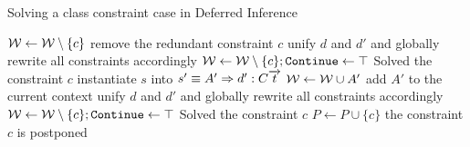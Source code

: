 \begin{algorithm}
    \caption{Solving a class constraint case in Deferred Inference}
    \label{case_class}
    \begin{algorithmic}
            \State $\mathcal W \gets \mathcal W \setminus \{c\}$ \Comment remove the redundant constraint $c$
            \State unify $d$ and $d'$ and globally rewrite all constraints accordingly
            \State $\mathcal W \gets \mathcal W \setminus \{c\}; \mathtt{Continue} \gets \top$ \Comment Solved the constraint $c$
            \State instantiate $s$ into $s' \equiv A' \Rightarrow d' : C \overrightarrow{t}$
            \State $\mathcal{W} \gets \mathcal{W} \cup A'$ \Comment add $A'$ to the current context
            \State unify $d$ and $d'$ and globally rewrite all constraints accordingly
            \State $\mathcal W \gets \mathcal W \setminus \{c\}; \mathtt{Continue} \gets \top$ \Comment Solved the constraint $c$
        \Else
            \State $P \gets P \cup \{c\}$ \Comment the constraint $c$ is postponed
        \EndIf
    \end{algorithmic}
\end{algorithm}

